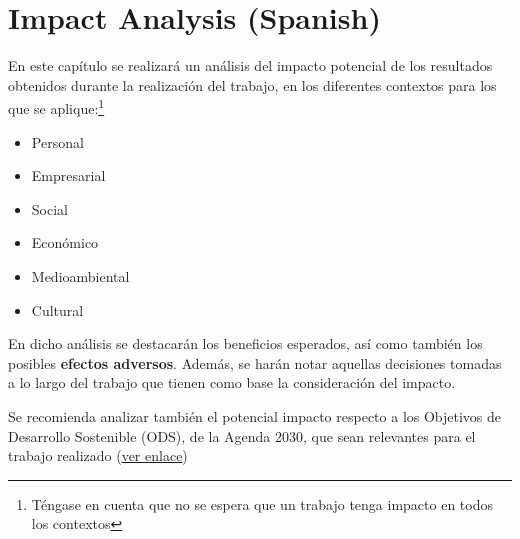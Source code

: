 \chapter{Impact Analysis (Spanish)}
En este capítulo se realizará un análisis del impacto potencial de los resultados obtenidos durante la realización del trabajo, en los diferentes contextos para los que se aplique:\footnote{Téngase en cuenta que no se espera que un trabajo tenga impacto en todos los contextos}

\begin{itemize}
\item Personal
\item Empresarial
\item Social
\item Económico
\item Medioambiental
\item Cultural
\end{itemize}

En dicho análisis se destacarán los beneficios esperados, así como también los posibles \textbf{efectos adversos}.
Además, se harán notar aquellas decisiones tomadas a lo largo del trabajo que tienen como base la consideración del impacto.

Se recomienda analizar también el potencial impacto respecto a los Objetivos de Desarrollo Sostenible (ODS), de la Agenda 2030, que sean relevantes para el trabajo realizado (\href{https://www.un.org/sustainabledevelopment/es/objetivos-de-desarrollo-sostenible/}{ver enlace})
